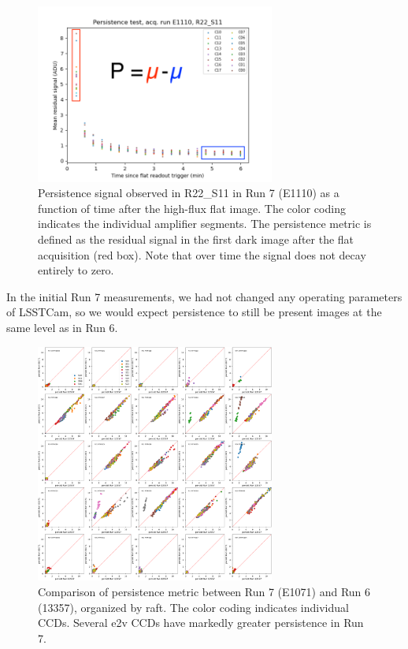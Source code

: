 \begin{figure}[H]
\begin{centering}
\includegraphics[width=0.7\textwidth]{figures/baselineCharacterization/persistence_plot_LSSTCam_R22_S11_u_lsstccs_eo_persistence_E1110_w_2024_35_20240926T235141Z.png}
\caption{Persistence signal observed in R22\_S11 in Run 7 (E1110) as a function of time after the high-flux flat image.  The color coding indicates the individual amplifier segments.  The persistence metric is defined as the residual signal in the first dark image after the flat acquisition (red box).  Note that over time the signal does not decay entirely to zero.}
\label{fig:persistence-decay}
\end{centering}
\end{figure}

In the initial Run 7 measurements, we had not changed any operating
parameters of LSSTCam, so we would expect persistence to still be
present images at the same level as in Run 6.

\begin{figure}[H]
\begin{centering}
\includegraphics[width=0.7\textwidth]{figures/baselineCharacterization/13557_E1071_persist.png}
\caption{Comparison of persistence metric between Run 7 (E1071) and Run 6 (13357), organized by raft.  The color coding indicates individual CCDs.  Several e2v CCDs have markedly greater persistence in Run 7.}
\label{fig:persistence-comp}
\end{centering}
\end{figure}

